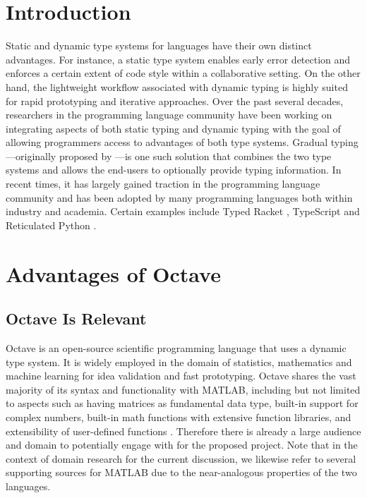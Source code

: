 \newcommand{\fig}[2]{\texttt{[image: \#2]}}
\newcommand{\centerfig}[2]{\begin{center}
\color{black} \texttt{[image: \#2]}\end{center}}

\section{Introduction}
Static and dynamic type systems for languages have their own distinct advantages. For instance, a static type system enables early error detection and enforces a certain extent of code style within a collaborative setting. On the other hand, the lightweight workflow associated with dynamic typing is highly suited for rapid prototyping and iterative approaches. Over the past several decades, researchers in the programming language community have been working on integrating aspects of both static typing and dynamic typing with the goal of allowing programmers access to advantages of both type systems. Gradual typing---originally proposed by \citet{siek2006gradual}---is one such solution that combines the two type systems and allows the end-users to optionally provide typing information. In recent times, it has largely gained traction in the programming language community and has been adopted by many programming languages both within industry and academia. Certain examples include Typed Racket \cite{tobin2006interlanguage}, TypeScript \cite{bierman2014understanding} and Reticulated Python \cite{vitousek2014design}.

\section{Advantages of Octave}
\subsection{Octave Is Relevant}
Octave is an open-source scientific programming language that uses a dynamic type system. It is widely employed in the domain of statistics, mathematics and machine learning for idea validation and fast prototyping. Octave shares the vast majority of its syntax and functionality with MATLAB, including but not limited to aspects such as having matrices as fundamental data type, built-in support for complex numbers, built-in math functions with extensive function libraries, and extensibility of user-defined functions \cite{wikibooks}. Therefore there is already a large audience and domain to potentially engage with for the proposed project. Note that in the context of domain research for the current discussion, we likewise refer to several supporting sources for MATLAB due to the near-analogous properties of the two languages.

